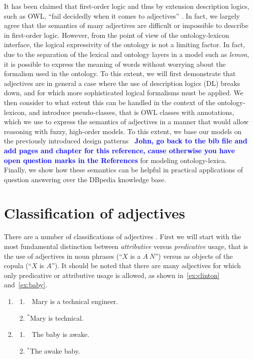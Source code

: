 \documentclass[11pt]{article}
\begin{document}
It has been claimed that first-order logic and thus by extension description 
logics, such as OWL, ``fail decidedly when it comes to adjectives''
\cite{bankston2003modeling}. In fact, we largely agree that the semantics 
of many adjectives are difficult or impossible to describe in first-order logic. 
However, from the point of view of the ontology-lexicon interface, the logical 
expressivity of the ontology is not a limiting factor. In fact, due to the 
separation of the lexical and ontology layers in a model such as \emph{lemon}, 
it is possible to express the meaning of words without worrying about the 
formalism used in the ontology. To this extent, we will first demonstrate that 
adjectives are in general a case where the use of description logics (DL) breaks down, 
and for which more sophisticated logical formalisms must be applied. We then 
consider to what extent this can be handled in the context of the 
ontology-lexicon, and introduce pseudo-classes, that is OWL classes with 
annotations, which we use to express the semantics of adjectives in a manner
that would allow reasoning with fuzzy, high-order models. To this extent, we base
our models on the previously introduced design patterns~\textbf{\textcolor{blue}{\cite{mccrae2014design} John, go back to the bib file and add pages and chapter for this reference, cause otherwise you have open question marks in the References}}
for modeling ontology-lexica. 
Finally, we show how these semantics can be helpful in practical applications 
of question answering over the DBpedia knowledge base.

\section{Classification of adjectives}

There are a number of classifications of adjectives \cite{}. First we will start 
with the most fundamental distinction between \emph{attributive} versus 
\emph{predicative} usage, that is the use of adjectives in noun phrases 
(``$X$ is a $A~N$'') versus as objects of the copula (``$X$ is $A$''). 
It should be noted that there are many adjectives for which only predicative or 
attributive usage is allowed, as shown in~\ref{ex:clinton} and~\ref{ex:baby}.

\begin{enumerate}[resume]
\item \begin{enumerate}	
\item \ \,Mary is a technical engineer. \label{ex:engineer}
\item $^\ast$Mary is technical.
\end{enumerate}
\label{ex:technical}
\item \begin{enumerate}	
\item \ \,The baby is awake.
\item $^\ast$The awake baby.
\end{enumerate}
\label{ex:baby}
\end{enumerate}
\end{document}
